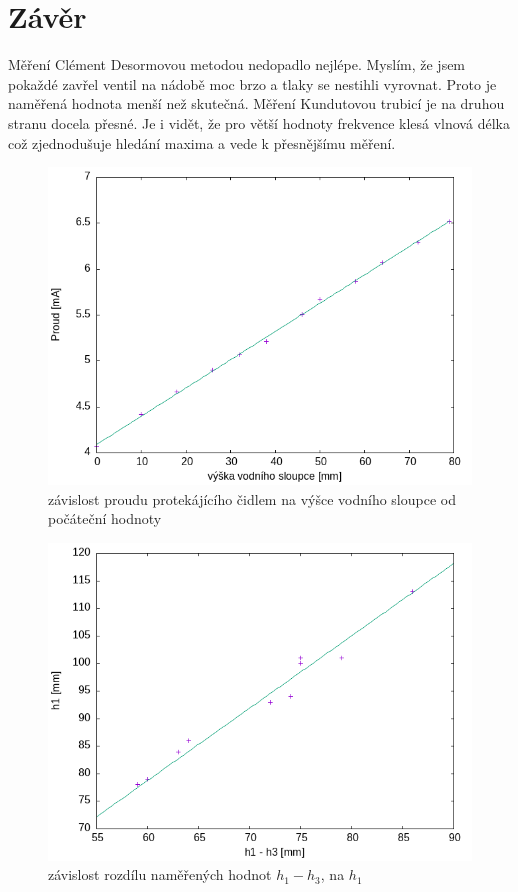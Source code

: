 \documentclass[a4paper,11pt]{article}
\begin{document}
\section{Závěr}

Měření Clément Desormovou metodou nedopadlo nejlépe. Myslím, že jsem pokaždé zavřel ventil na nádobě moc brzo a tlaky se nestihli vyrovnat.
Proto je naměřená hodnota menší než skutečná. Měření Kundutovou trubicí je na druhou stranu docela přesné. 
Je i vidět, že pro větší hodnoty frekvence klesá vlnová délka což zjednodušuje hledání maxima a vede k přesnějšímu měření.



\begin{figure}[bp!]
  \centering
  \includegraphics[width=0.7\linewidth]{kalibrace_proudu.png}
  \caption{závislost proudu protekájícího čidlem na výšce vodního sloupce od počáteční hodnoty}
  \label{fig:1}
\end{figure}

\begin{figure}[bp!]
  \centering
  \includegraphics[width=0.7\linewidth]{clement.png}
  \caption{závislost rozdílu naměřených hodnot $h_1 - h_3$, na $h_1$}
  \label{fig:2}
\end{figure}
\end{document}
